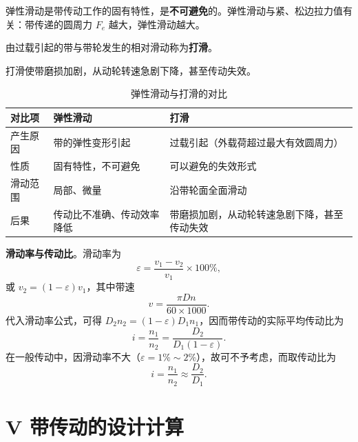 弹性滑动是带传动工作的固有特性，是\textbf{不可避免}的。弹性滑动与紧、松边拉力值有关：带传递的圆周力 $F_e$ 越大，弹性滑动越大。

\begin{definition}[打滑]
	由过载引起的带与带轮发生的相对滑动称为\textbf{打滑}。
\end{definition}

打滑使带磨损加剧，从动轮转速急剧下降，甚至传动失效。

\begin{table}[H]
\centering
\small
\setlength{\tabcolsep}{4pt}
\caption{弹性滑动与打滑的对比}
\label{tab:带传动:弹性滑动与打滑}
\begin{tabular}{p{2.2cm}p{5.6cm}p{5.6cm}}
	\toprule
	对比项 & 弹性滑动 & 打滑 \\
	\midrule
	产生原因 & 带的弹性变形引起 & 过载引起（外载荷超过最大有效圆周力） \\
	性质 & 固有特性，不可避免 & 可以避免的失效形式 \\
	滑动范围 & 局部、微量 & 沿带轮面全面滑动 \\
	后果 & 传动比不准确、传动效率降低 & 带磨损加剧，从动轮转速急剧下降，甚至传动失效 \\
	\bottomrule
\end{tabular}
\end{table}

\textbf{滑动率与传动比}。滑动率为
\begin{equation}
	\varepsilon=\frac{v_1-v_2}{v_1}\times 100\%,
	\label{eq:带传动:滑动率}
\end{equation}
或 $v_2=(1-\varepsilon)v_1$，其中带速
\begin{equation}
	v=\frac{\pi Dn}{60\times 1000}.
	\label{eq:带传动:带速}
\end{equation}
代入滑动率公式，可得 $D_2n_2=(1-\varepsilon)D_1n_1$，因而带传动的实际平均传动比为
\begin{equation}
	i=\frac{n_1}{n_2}=\frac{D_2}{D_1(1-\varepsilon)}.
	\label{eq:带传动:传动比}
\end{equation}
在一般传动中，因滑动率不大（$\varepsilon=1\%\sim2\%$），故可不予考虑，而取传动比为
\begin{equation}
	i=\frac{n_1}{n_2}\approx\frac{D_2}{D_1}.
	\label{eq:带传动:近似传动比}
\end{equation}

\section{V 带传动的设计计算}
\label{sec:带传动:设计计算}

